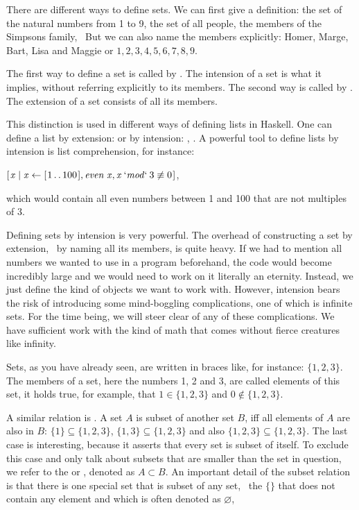 \documentclass{scrreprt}
\newcommand{\Varid}[1]{\mathit{#1}}
\begin{document}
There are different ways to define sets.
We can first give a definition:
the set of the natural numbers from 1 to 9,
the set of all people, 
the members of the Simpsons family, \etc\
But we can also name the members explicitly:
Homer, Marge, Bart, Lisa and Maggie or
$1,2,3,4,5,6,7,8,9$.

The first way to define a set is called 
by . The intension of a set is
what it implies, without referring explicitly
to its members.
The second way is called by .
The extension of a set consists of all its members.

This distinction is used in different ways of
defining lists in Haskell.
One can define a list by extension:
\haskell{[1,2,3,4,5]}
or by intension:
\haskell{[1..5]}, \haskell{[1..]}.
A powerful tool to define lists by intension 
is list comprehension, for instance:

\ensuremath{[\mskip1.5mu \Varid{x}\mid \Varid{x}\leftarrow [\mskip1.5mu \mathrm{1}\mathinner{\ldotp\ldotp}\mathrm{100}\mskip1.5mu],\Varid{even}\;\Varid{x},\Varid{x}\mathbin{\Varid{`mod`}}\mathrm{3}\not\equiv \mathrm{0}\mskip1.5mu]},

which would contain all even numbers
between 1 and 100 that are not multiples of 3.

Defining sets by intension is 
very powerful. 
The overhead of constructing a set by extension,
\ie\ by naming all its members,
is quite heavy.
If we had to mention all numbers we wanted to use
in a program beforehand, the code would become incredibly large
and we would need to work on it literally an eternity.
Instead, we just define the kind of objects we want to work with.
However, intension bears the risk
of introducing some mind-boggling complications,
one of which is infinite sets.
For the time being, 
we will steer clear of any of these complications.
We have sufficient work with the kind of math
that comes without fierce creatures like infinity.

Sets, as you have already seen, are written in braces
like, for instance:
$\lbrace 1,2,3\rbrace$.
The members of a set, here the numbers 1, 2 and 3,
are called elements of this set,
it holds true, for example, that
$1 \in \lbrace 1,2,3\rbrace$ and 
$0 \not\in \lbrace 1,2,3\rbrace$.

A similar relation is .
A set $A$ is subset of another set $B$, iff
all elements of $A$ are also in $B$:
$\lbrace 1\rbrace \subseteq \lbrace 1,2,3\rbrace$,
$\lbrace 1,3\rbrace \subseteq \lbrace 1,2,3\rbrace$
and also
$\lbrace 1,2,3\rbrace \subseteq \lbrace 1,2,3\rbrace$.
The last case is interesting,
because it asserts that every set is subset of itself.
To exclude this case and only talk about subsets
that are smaller than the set in question,
we refer to the  or ,
denoted as $A \subset B$.
An important detail of the subset relation is
that there is one special set that is subset of any set,
\viz\ the  $\lbrace\rbrace$
that does not contain any element and which is 
often denoted as $\varnothing$,
\end{document}
